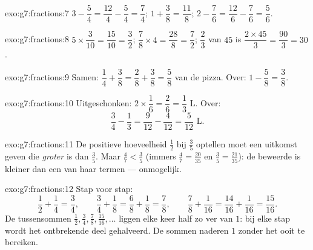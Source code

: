 \begin{solution}{exo:g7:fractions:7}
$3 - \dfrac54 = \dfrac{12}{4} - \dfrac54 = \dfrac74$; \quad
$1 + \dfrac38 = \dfrac{11}{8}$; \quad
$2 - \dfrac76 = \dfrac{12}{6} - \dfrac76 = \dfrac56$.
\end{solution}

\begin{solution}{exo:g7:fractions:8}
$5 \times \dfrac{3}{10} = \dfrac{15}{10} = \dfrac32$; \quad
$\dfrac78 \times 4 = \dfrac{28}{8} = \dfrac72$; \quad
$\dfrac23$ van $45$ is $\dfrac{2 \times 45}{3} = \dfrac{90}{3} = 30$.
\end{solution}

\begin{solution}{exo:g7:fractions:9}
Samen: $\dfrac14 + \dfrac38 = \dfrac28 + \dfrac38 = \dfrac58$ van de pizza. Over:
$1 - \dfrac58 = \dfrac38$.
\end{solution}

\begin{solution}{exo:g7:fractions:10}
Uitgeschonken: $2 \times \dfrac16 = \dfrac26 = \dfrac13$ L. Over:
\[
\frac34 - \frac13 = \frac{9}{12} - \frac{4}{12} = \frac{5}{12}
\text{ L}.
\]
\end{solution}

\begin{solution}{exo:g7:fractions:11}
De positieve hoeveelheid $\frac12$ bij $\frac35$ optellen moet een uitkomst geven
die \emph{groter} is dan $\frac35$. Maar $\frac47 < \frac35$ (immers
$\frac47 = \frac{20}{35}$ en $\frac35 = \frac{21}{35}$): de beweerde  is
kleiner dan een van haar termen --- onmogelijk.
\end{solution}

\begin{solution}{exo:g7:fractions:12}
Stap voor stap:
\[
\frac12 + \frac14 = \frac34, \qquad
\frac34 + \frac18 = \frac68 + \frac18 = \frac78, \qquad
\frac78 + \frac1{16} = \frac{14}{16} + \frac1{16} = \frac{15}{16}.
\]
De tussensommen $\frac12, \frac34, \frac78, \frac{15}{16}, \dots$ liggen elke keer
half zo ver van $1$: bij elke stap wordt het ontbrekende deel gehalveerd. De
sommen naderen $1$ zonder het ooit te bereiken.
\end{solution}

